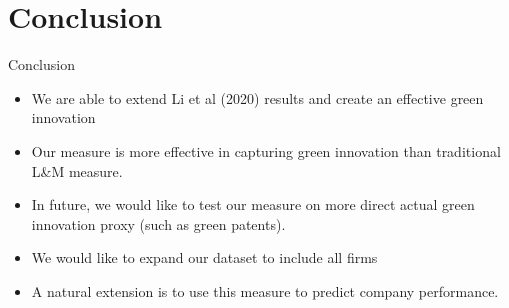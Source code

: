 \documentclass[cjk,usenames,dvipsnames]{beamer}
\begin{document}
\section{Conclusion}
\begin{frame}{Conclusion}
\begin{itemize}
    \item We are able to extend Li et al (2020) results and create an effective green innovation
    \item Our measure is more effective in capturing green innovation than traditional L\&M measure.
    \item In future, we would like to test our measure on more direct actual green innovation proxy (such as green patents).
    \item We would like to expand our dataset to include all firms
    \item A natural extension is to use this measure to predict company performance.
\end{itemize}
\end{frame}
\end{document}

